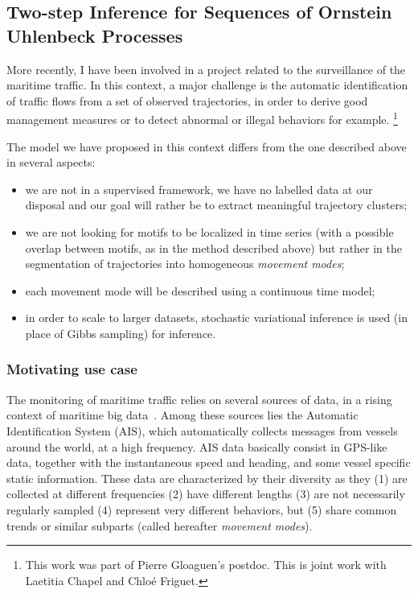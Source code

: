 \subsection{Two-step Inference for Sequences of Ornstein Uhlenbeck Processes}
\label{sec:oup}

More recently, I have been involved in a project related to the surveillance of
the maritime traffic.
In this context, a major challenge
is the automatic identification of traffic flows from a set of observed
trajectories, in order to derive good management measures or to detect abnormal
or illegal behaviors for example.%
\footnote{This work was part of Pierre Gloaguen's postdoc.
This is joint work with Laetitia Chapel and Chloé Friguet.}

The model we have proposed in this context differs from the one described above
in several aspects:

\begin{itemize}
\item we are not in a supervised framework, we have no labelled data at our disposal
and our goal will rather be to extract meaningful trajectory clusters;
\item we are not looking for motifs to be localized in time series (with
a possible overlap between motifs, as in the method described above) but rather
in the segmentation of trajectories into homogeneous \emph{movement modes};
\item each movement mode will be described using a continuous time model;
\item in order to scale to larger datasets, stochastic variational inference is used
(in place of Gibbs sampling) for inference.
\end{itemize}

\subsubsection{Motivating use case}

The monitoring of maritime traffic relies on several sources of data, in a
rising context of maritime big data~\cite{garnier2016exploiting}.
Among these sources lies the Automatic Identification System (AIS), which
automatically collects messages from vessels around the world, at a high
frequency.
AIS data basically consist in GPS-like data, together with the instantaneous
speed and heading, and some vessel specific static information.
These data are characterized by their diversity as they (1) are collected at
different frequencies (2) have different lengths (3) are not necessarily
regularly sampled (4) represent very different behaviors, but (5) share common
trends or similar subparts (called hereafter \emph{movement modes}).

